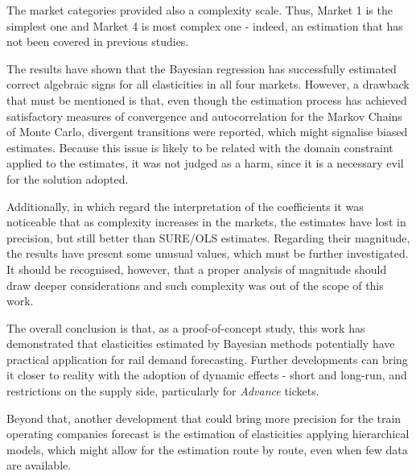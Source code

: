 The market categories provided also a complexity scale. Thus, Market 1 is the simplest one and Market 4 is most complex one - indeed, an estimation that has not been covered in previous studies.

The results have shown that the Bayesian regression has successfully estimated correct algebraic signs for all elasticities in all four markets. However, a drawback that must be mentioned is that, even though the estimation process has achieved satisfactory measures of convergence and autocorrelation for the Markov Chains of Monte Carlo, divergent transitions were reported, which might signalise biased estimates. Because this issue is likely to be related with the domain constraint applied to the estimates, it was not judged as a harm, since it is a necessary evil for the solution adopted.

Additionally, in which regard the interpretation of the coefficients it was noticeable that as complexity increases in the markets, the estimates have lost in precision, but still better than SURE/OLS estimates. Regarding their magnitude, the results have present some unusual values, which must be further investigated. It should be recognised, however, that a proper analysis of magnitude should draw deeper considerations and such complexity was out of the scope of this work.

The overall conclusion is that, as a proof-of-concept study, this work has demonstrated that elasticities estimated by Bayesian methods potentially have practical application for rail demand forecasting. Further developments can bring it closer to reality with the adoption of dynamic effects - short and long-run, and restrictions on the supply side, particularly for \textit{Advance} tickets.

Beyond that, another development that could bring more precision for the train operating companies forecast is the estimation of elasticities applying hierarchical models, which might allow for the estimation route by route, even when few data are available.



